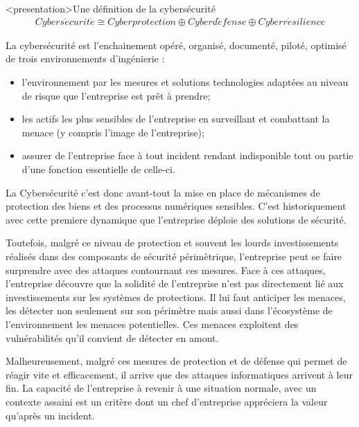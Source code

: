 \begin{frame}<presentation>{Une définition de la cybersécurité}
\begin{align}
Cybers\acute{e}curit\acute{e} \cong Cyberprotection\oplus Cyberd\acute{e}fense \oplus Cyberr\acute{e}silience
\end{align}
\end{frame}

\begin{frame}

La cybersécurité est l'enchainement opéré, organisé, documenté, piloté, optimisé de trois environnements d'ingénierie :
\begin{itemize}
 \item {} l'environnement par les mesures et solutions technologies adaptées au niveau de risque que l'entreprise est prêt à prendre; 
 \item {} les actifs les plus sensibles de l'entreprise en surveillant et combattant la menace (y compris l'image de l'entreprise);
 \item assurer  de l'entreprise face à tout incident rendant indisponible tout ou partie d'une fonction essentielle de celle-ci.
\end{itemize}

\end{frame}

La Cybersécurité c’est donc avant-tout la mise en place de mécanismes de protection des biens et des processus numériques sensibles. C’est historiquement avec cette premiere dynamique que l’entreprise déploie des solutions de sécurité. 

Toutefois, malgré ce niveau de protection et souvent les lourds investissements réalisés dans des composants de sécurité périmètrique, l’entreprise peut se faire surprendre avec des attaques contournant ces mesures. Face à ces attaques, l’entreprise découvre que la solidité de l’entreprise n’est pas directement lié aux investissements sur les systèmes de protections. Il lui faut anticiper les menaces, les détecter non seulement sur son périmètre mais aussi dans l’écosystème de l’environnement les menaces potentielles. Ces menaces exploitent des vulnérabilités qu’il convient de détecter en amont.

Malheureusement, malgré ces mesures de protection et de défense qui permet de réagir vite et efficacement, il arrive que des attaques informatiques arrivent à leur fin. La capacité de l’entreprise à revenir à une situation normale, avec un contexte assaini est un critère dont un chef d’entreprise appréciera la valeur qu’après un incident.


